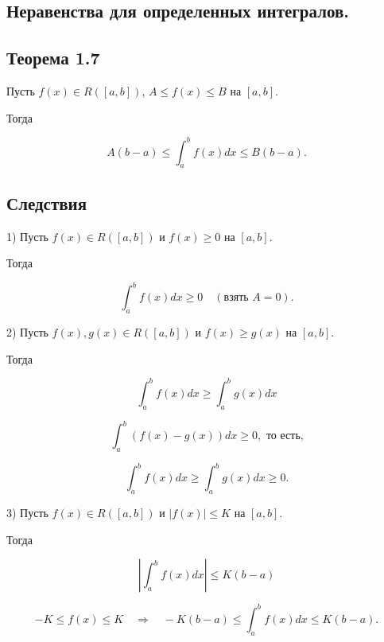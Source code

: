 {
\subsection{Неравенства для определенных интегралов.}
\subsection*{Теорема 1.7}

Пусть \( f(x) \in R([a, b]) \), \( A \leq f(x) \leq B \) на \( [a, b] \).

Тогда

\[
A(b - a) \leq \int_{a}^{b} f(x)dx \leq B(b - a).
\]

\subsection*{Следствия}

1) Пусть \( f(x) \in R([a, b]) \) и \( f(x) \geq 0 \) на \( [a, b] \).

Тогда


\[
\int_{a}^{b} f(x) dx \geq 0 \quad (\text{взять } A = 0).
\]



2) Пусть \( f(x), g(x) \in R([a, b]) \) и \( f(x) \geq g(x) \) на \( [a, b] \).

Тогда


\[
\int_{a}^{b} f(x) dx \geq \int_{a}^{b} g(x) dx
\]




\[
\int_{a}^{b} (f(x) - g(x)) dx \geq 0, \text{ то есть,}
\]




\[
\int_{a}^{b} f(x) dx \geq \int_{a}^{b} g(x) dx \geq 0.
\]



3) Пусть \( f(x) \in R([a, b]) \) и \( |f(x)| \leq K \) на \( [a, b] \). 

Тогда


\[
\left| \int_{a}^{b} f(x) dx \right| \leq K(b - a)
\]




\[
-K \leq f(x) \leq K \quad \Rightarrow \quad -K(b - a) \leq \int_{a}^{b} f(x) dx \leq K(b - a).
\]



}
